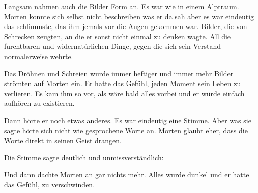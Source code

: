 \par

Langsam nahmen auch die Bilder Form an. Es war wie in einem Alptraum. Morten konnte sich selbst nicht beschreiben was er da sah aber es war eindeutig das schlimmste, das ihm jemals vor die Augen gekommen war. Bilder, die von Schrecken zeugten, an die er sonst nicht einmal zu denken wagte. All die furchtbaren und widernatürlichen Dinge, gegen die sich sein Verstand normalerweise wehrte.

\par

Das Dröhnen und Schreien wurde immer heftiger und immer mehr Bilder strömten auf Morten ein. Er hatte das Gefühl, jeden Moment sein Leben zu verlieren. Es kam ihm so vor, als wäre bald alles vorbei und er würde einfach aufhören zu existieren.

\par

Dann hörte er noch etwas anderes. Es war eindeutig eine Stimme. Aber was sie sagte hörte sich nicht wie gesprochene Worte an. Morten glaubt eher, dass die Worte direkt in seinen Geist drangen.

\par

Die Stimme sagte deutlich und unmissverständlich: 

\par

Und dann dachte Morten an gar nichts mehr. Alles wurde dunkel und er hatte das Gefühl, zu verschwinden.